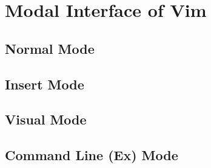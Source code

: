 \chapter{Modal Interface of Vim}

\section{Normal Mode}


\section{Insert Mode}


\section{Visual Mode}


\section{Command Line (Ex) Mode}
